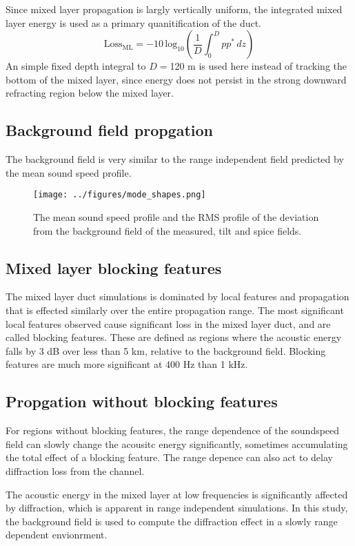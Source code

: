 \documentclass[preprint,NumberedRefs]{JASA}
\begin{document}
Since mixed layer propagation is largly vertically uniform, the integrated mixed layer energy is used as a primary quanitification of the duct.
\begin{equation}
    \textrm{Loss}_{\textrm{ML}} = -10 \, \textrm{log}_{10} \left( \frac{1}{D} \int^{D}_0 p p^* \,  dz \right)
\end{equation}
An simple fixed depth integral to $D=$120 m is used here instead of tracking the bottom of the mixed layer, since energy does not persist in the strong downward refracting region below the mixed layer.

\subsection{Background field propgation}
The background field is very similar to the range independent field predicted by the mean sound speed profile.
\begin{figure}
\texttt{[image: ../figures/mode\_shapes.png]}
    \caption{\label{fig:c_rms}{The mean sound speed profile and the RMS profile of the deviation from the background field of the measured, tilt and spice fields.}}
\end{figure}


\subsection{Mixed layer blocking features}
The mixed layer duct simulations is dominated by local features and propagation that is effected similarly over the entire propagation range. The most significant local features observed cause significant loss in the mixed layer duct, and are called blocking features. These are defined as regions where the acoustic energy falls by 3 dB over less than 5 km, relative to the background field. Blocking features are much more significant at 400 Hz than 1 kHz.

\subsection{Propgation without blocking features}

For regions without blocking features, the range dependence of the soundspeed field can slowly change the acousitc energy significantly, sometimes accumulating the total effect of a blocking feature. The range depence can also act to delay diffraction loss from the channel.

The acoustic energy in the mixed layer at low frequencies is significantly affected by diffraction, which is apparent in range independent simulations. In this study, the background field is used to compute the diffraction effect in a slowly range dependent envionrment.



\end{document}
